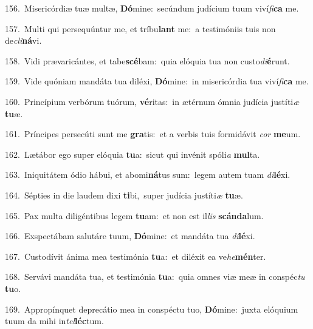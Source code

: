 {\numbfont\textcolor{\numbcolor}{156.}}~Misericórdiæ tuæ multæ, \textbf{Dó}\-mine:~\star secúndum judícium tuum viví\-\textit{fi}\-\textbf{ca} me.\par
{\numbfont\textcolor{\numbcolor}{157.}}~Multi qui persequúntur me, et tríbu\textbf{lant} me:~\star a testimóniis tuis non de\-\textit{cli}\-\textbf{ná}vi.\par
{\numbfont\textcolor{\numbcolor}{158.}}~Vidi prævaricántes, et tabe\-\textbf{scé}\-bam:~\star quia elóquia tua non custo\-\textit{di}\-\textbf{é}runt.\par
{\numbfont\textcolor{\numbcolor}{159.}}~Vide quóniam mandáta tua diléxi, \textbf{Dó}\-mine:~\star in misericórdia tua viví\-\textit{fi}\-\textbf{ca} me.\par
{\numbfont\textcolor{\numbcolor}{160.}}~Princípium verbórum tuórum, \textbf{vé}\-ritas:~\star in ætérnum ómnia judícia justíti\textit{æ} \textbf{tu}\-æ.\par
{\numbfont\textcolor{\numbcolor}{161.}}~Príncipes persecúti sunt me \textbf{gra}\-tis:~\star et a verbis tuis formidávit \textit{cor} \textbf{me}\-um.\par
{\numbfont\textcolor{\numbcolor}{162.}}~Lætábor ego super elóquia \textbf{tu}\-a:~\star sicut qui invénit spóli\textit{a} \textbf{mul}\-ta.\par
{\numbfont\textcolor{\numbcolor}{163.}}~Iniquitátem ódio hábui, et abomi\-\textbf{ná}\-tus sum:~\star legem autem tuam \textit{di}\-\textbf{lé}xi.\par
{\numbfont\textcolor{\numbcolor}{164.}}~Sépties in die laudem dixi \textbf{ti}\-bi,~\star super judícia justíti\textit{æ} \textbf{tu}\-æ.\par
{\numbfont\textcolor{\numbcolor}{165.}}~Pax multa diligéntibus legem \textbf{tu}\-am:~\star et non est il\textit{lis} \textbf{scán}\-\textbf{da}lum.\par
{\numbfont\textcolor{\numbcolor}{166.}}~Exspectábam salutáre tuum, \textbf{Dó}\-mine:~\star et mandáta tua \textit{di}\-\textbf{lé}xi.\par
{\numbfont\textcolor{\numbcolor}{167.}}~Custodívit ánima mea testimónia \textbf{tu}\-a:~\star et diléxit ea ve\-\textit{he}\-\textbf{mén}ter.\par
{\numbfont\textcolor{\numbcolor}{168.}}~Servávi mandáta tua, et testimónia \textbf{tu}\-a:~\star quia omnes viæ meæ in conspéc\textit{tu} \textbf{tu}\-o.\par
{\numbfont\textcolor{\numbcolor}{169.}}~Appropínquet deprecátio mea in conspéctu tuo, \textbf{Dó}\-mine:~\star juxta elóquium tuum da mihi in\-\textit{tel}\-\textbf{léc}tum.\par
